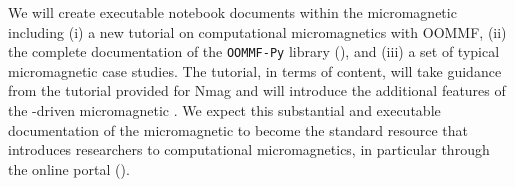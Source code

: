 \begin{workpackage}
\begin{tasklist}
\begin{task}[lead=USO,title=Demonstrator: micromagnetic VRE notebooks,
  id=oommf-tutorial-and-documentation,PM=6,partners={SR,PS},wphases=19-25,issue=81]
  We will create executable notebook documents
  within the micromagnetic \VRE
  including (i) a new tutorial on computational micromagnetics with
  OOMMF, (ii) the complete documentation of the \texttt{OOMMF-Py}
  library (),
  and (iii) a set of typical micromagnetic case studies. The tutorial,
  in terms of content, will take guidance from the tutorial provided
  for Nmag \cite{Nmag-tutorial-url} and will introduce the additional
  features of the \Jupyter-driven micromagnetic \VRE. We expect this
  substantial and executable documentation of the micromagnetic \VRE to
  become the standard resource that introduces researchers to
  computational micromagnetics, in particular through the online
  portal ().

\end{task}


\end{tasklist}
\end{workpackage}
